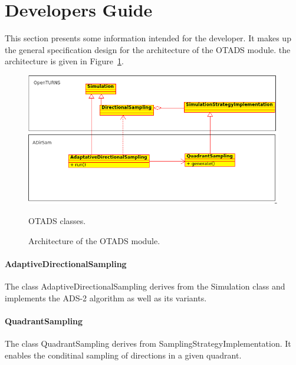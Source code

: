 % 




\section{Developers Guide}

This section presents some information intended for the developer. It makes up the general specification design for the architecture of the OTADS module. the architecture is given in Figure~\ref{fig:architecture}.\par

\begin{figure}[htb]
    \begin{center}
        \includegraphics[scale=0.8]{architecture.png}
        \caption{OTADS classes.}\label{fig:architecture}
    \end{center}
    \label{fig:architecture}
    \caption{Architecture of the OTADS module.}
\end{figure}

\paragraph{AdaptiveDirectionalSampling}

The class AdaptiveDirectionalSampling derives from the Simulation class and implements the ADS-2 algorithm as well as its variants.\\

\paragraph{QuadrantSampling}

The class QuadrantSampling derives from SamplingStrategyImplementation. It enables the conditinal sampling of directions in a given quadrant.\\


